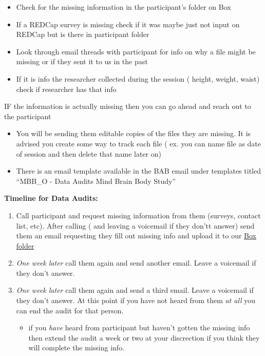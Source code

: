 \documentclass[
]{book}
\providecommand{\tightlist}{%
  \setlength{\itemsep}{0pt}\setlength{\parskip}{0pt}}
\begin{document}
\begin{itemize}
\item
  Check for the missing information in the participant's folder on Box
\item
  If a REDCap survey is missing check if it was maybe just not input on REDCap but is there in participant folder
\item
  Look through email threads with participant for info on why a file might be missing or if they sent it to us in the past
\item
  If it is info the researcher collected during the session ( height, weight, waist) check if researcher has that info
\end{itemize}

IF the information is actually missing then you can go ahead and reach out to the participant

\begin{itemize}
\item
  You will be sending them editable copies of the files they are missing. It is advised you create some way to track each file ( ex. you can name file as date of session and then delete that name later on)
\item
  There is an email template available in the BAB email under templates titled ``MBB\_O - Data Audits Mind Brain Body Study''
\end{itemize}

\textbf{Timeline for Data Audits:}

\begin{enumerate}
\def\labelenumi{\arabic{enumi})}
\item
  Call participant and request missing information from them (surveys, contact list, etc). After calling ( and leaving a voicemail if they don'tt answer) send them an email requesting they fill out missing info and upload it to our \href{https://ucla.app.box.com/f/3c52df2afb1a446ab363b793f8af22c1}{Box folder}
\item
  \emph{One week later} call them again and send another email. Leave a voicemail if they don't answer.
\item
  \emph{One week later} call them again and send a third email. Leave a voicemail if they don't answer. At this point if you have not heard from them \emph{at all} you can end the audit for that person.

  \begin{itemize}
  \tightlist
  \item
    if you \emph{have} heard from participant but haven't gotten the missing info then extend the audit a week or two at your discrection if you think they will complete the missing info.
  \end{itemize}
\end{enumerate}
\end{document}

